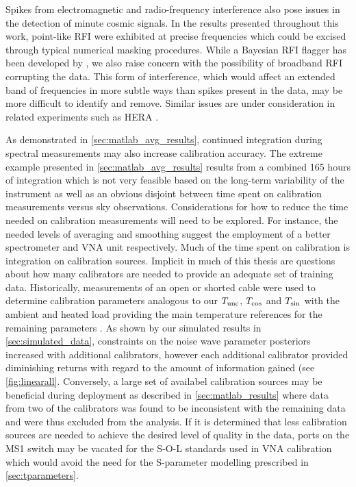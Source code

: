 Spikes from electromagnetic and radio-frequency interference also pose issues in the detection of minute cosmic signals. In the results presented throughout this work, point-like RFI were exhibited at precise frequencies which could be excised through typical numerical masking procedures. While a Bayesian RFI flagger has been developed by \citet{sam_rfi}, we also raise concern with the possibility of broadband RFI corrupting the data. This form of interference, which would affect an extended band of frequencies in more subtle ways than spikes present in the data, may be more difficult to identify and remove. Similar issues are under consideration in related experiments such as HERA \citep{hera_rfi}.

As demonstrated in \cref{sec:matlab_avg_results}, continued integration during spectral measurements may also increase calibration accuracy. The extreme example presented in \cref{sec:matlab_avg_results} results from a combined 165 hours of integration which is not very feasible based on the long-term variability of the instrument as well as an obvious disjoint between time spent on calibration measurements versus sky observations. Considerations for how to reduce the time needed on calibration measurements will need to be explored. For instance, the needed levels of averaging and smoothing suggest the employment of a better spectrometer and VNA unit respectively. Much of the time spent on calibration is integration on calibration sources. Implicit in much of this thesis are questions about how many calibrators are needed to provide an adequate set of training data. Historically, measurements of an open or shorted cable were used to determine calibration parameters analogous to our $T_{\mathrm{unc}}$, $T_{\mathrm{cos}}$ and $T_{\mathrm{sin}}$ \citep{rogersCal} with the ambient and heated load providing the main temperature references for the remaining parameters \citep{edgesCal}. As shown by our simulated results in \cref{sec:simulated_data}, constraints on the noise wave parameter posteriors increased with additional calibrators, however each additional calibrator provided diminishing returns with regard to the amount of information gained (see \cref{fig:linearall}. Conversely, a large set of availabel calibration sources may be beneficial during deployment as described in \cref{sec:matlab_results} where data from two of the calibrators was found to be inconsistent with the remaining data and were thus excluded from the analysis. If it is determined that less calibration sources are needed to achieve the desired level of quality in the data, ports on the MS1 switch may be vacated for the S-O-L standards used in VNA calibration which would avoid the need for the S-parameter modelling prescribed in \cref{sec:tparameters}.


